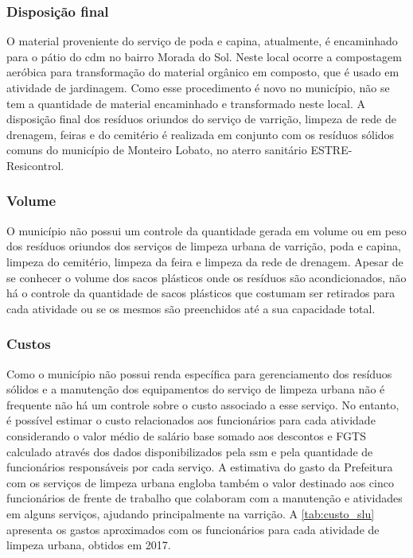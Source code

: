 \subsubsection{Disposição final}
O material proveniente do serviço de poda e capina, atualmente, é encaminhado para o pátio do \gls{cdm} no bairro Morada do Sol. Neste local ocorre a compostagem aeróbica para transformação do material orgânico em composto, que é usado em atividade de jardinagem. Como esse procedimento é novo no município, não se tem a quantidade de material encaminhado e transformado neste local. 
A disposição final dos resíduos oriundos do serviço de varrição, limpeza de rede de drenagem, feiras e do cemitério é realizada em conjunto com os resíduos sólidos comuns do município de Monteiro Lobato, no aterro sanitário ESTRE-Resicontrol.

\subsubsection{Volume}

O município não possui um controle da quantidade gerada em volume ou em peso dos resíduos oriundos dos serviços de limpeza urbana de varrição, poda e capina, limpeza do cemitério, limpeza da feira e limpeza da rede de drenagem.
Apesar de se conhecer o volume dos sacos plásticos onde os resíduos são acondicionados, não há o controle da quantidade de sacos plásticos que costumam ser retirados para cada atividade ou se os mesmos são preenchidos até a sua capacidade total.

\subsubsection{Custos}

Como o município não possui renda específica para gerenciamento dos resíduos sólidos e a manutenção dos equipamentos do serviço de limpeza urbana não é frequente não há um controle sobre o custo associado a esse serviço. No entanto, é possível estimar o custo relacionados aos funcionários para cada atividade considerando o valor médio de salário base somado aos descontos e FGTS calculado através dos dados disponibilizados pela \gls{ssm} e pela quantidade de funcionários responsáveis por cada serviço. A estimativa do gasto da Prefeitura com os serviços de limpeza urbana engloba também o valor destinado aos cinco funcionários de frente de trabalho que colaboram com a manutenção e atividades em alguns serviços, ajudando principalmente na varrição.  A \autoref{tab:custo_slu} apresenta os gastos aproximados com os funcionários para cada atividade de limpeza urbana, obtidos em 2017.

